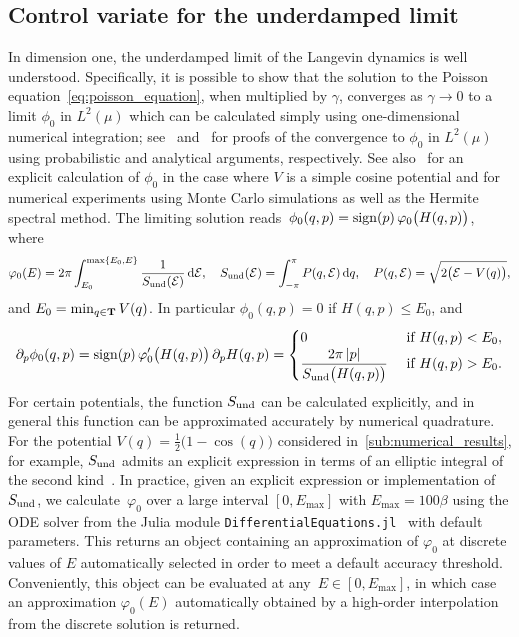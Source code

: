 \documentclass[11pt,a4paper]{article}
\begin{document}
\subsection{Control variate for the underdamped limit}%
\label{sub:underdamped_approach}
In dimension one, the underdamped limit of the Langevin dynamics is well understood.
Specifically, it is possible to show that the solution to the Poisson equation~\eqref{eq:poisson_equation},
when multiplied by $\gamma$,
converges as $\gamma \to 0$ to a limit $\phi_0$ in $L^2(\mu)$ which can be calculated simply using one-dimensional numerical integration;
see~\cite[Lemma 3.4]{MR2394704} and~\cite[Proposition 4.1]{roussel_thesis}
for proofs of the convergence to $\phi_0$ in $L^2(\mu)$ using probabilistic and analytical arguments,
respectively. See also~\cite{MR2427108} for an explicit calculation of $\phi_0$ in the case where $V$ is a simple cosine potential and for numerical experiments using Monte Carlo simulations as well as the Hermite spectral method. The limiting solution reads~$\phi_0(q,p) = \operatorname{sign}(p) \, \varphi_0\bigl(H(q,p)\bigr)$,
where
\[
    \varphi_0(E) = 2 \pi \int_{E_0}^{\max\{E_0, E\}} \frac{1}{S_{\rm und}(\mathcal E)} \, \mathrm d \mathcal E,
    \quad S_{\rm und}(\mathcal E) = \int_{-\pi}^{\pi} P(q, \mathcal E) \, \mathrm d q, \quad P(q, \mathcal E) = \sqrt {2 \bigl(\mathcal E - V(q)\bigr)},
\]
and $E_0 = \min_{q \in \mathbf T} V(q)$.
In particular $\phi_0(q,p) = 0$ if $H(q,p) \leq E_0$,
and
\[
    \partial_p \phi_0(q, p)
    = \sign(p) \, \varphi_0'\bigl(H(q,p)\bigr) \, \partial_p H(q,p)
    =
    \begin{cases}
        0 & \text{ if $H(q,p) < E_0$}, \\
        \displaystyle \frac{2 \pi \abs{p}}{S_{\rm und}\bigl(H(q,p)\bigr)} & \text{ if $H(q,p) > E_0$}.
    \end{cases}
\]
For certain potentials,
the function $S_{\rm und}$ can be calculated explicitly,
and in general this function can be approximated accurately by numerical quadrature.
For the potential $V(q) = \frac{1}{2} \bigl(1 - \cos(q)\bigr)$ considered in~\cref{sub:numerical_results},
for example, $S_{\rm und}$ admits an explicit expression in terms of an elliptic integral of the second kind~\cite{MR2427108}.
In practice, given an explicit expression or implementation of~$S_{\rm und}$,
we calculate~$\varphi_0$ over a large interval $[0, E_{\max}]$ with $E_{\max} = 100 \beta$
using the ODE solver from the Julia module \texttt{DifferentialEquations.jl}~\cite{rackauckas2017differentialequations} with default parameters.
This returns an object containing an approximation of $\varphi_0$ at discrete values of $E$ automatically selected in order to meet a default accuracy threshold.
Conveniently, this object can be evaluated at any~$E \in [0, E_{\max}]$,
in which case an approximation $\varphi_0(E)$ automatically obtained by a high-order interpolation from the discrete solution is returned.
\end{document}
